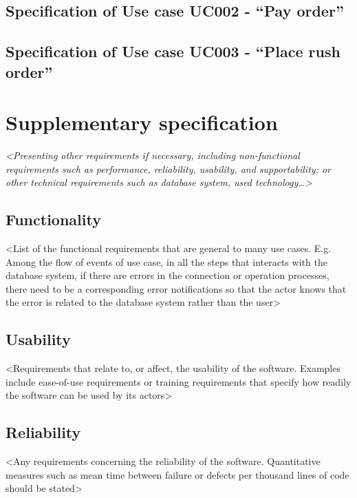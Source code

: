 \documentclass[letterpaper]{report}
\begin{document}
\section[Specification of Use case UC002 {}- “Pay order”]{Specification of Use case UC002 - “Pay order”}


\section[Specification of Use case UC003 {}- “Place rush order”]{Specification of Use case UC003 - “Place rush order”}



\chapter{Supplementary specification}
\textit{{\textless}Presenting other requirements if necessary, including non-functional requirements such as performance, reliability, usability, and supportability; or other technical requirements such as database system, used technology…{\textgreater}}

\section{Functionality}
 {\textless}List of the functional requirements that are general to many use cases. E.g. Among the flow of events of use case, in all the steps that interacts with the database system, if there are errors in the connection or operation processes, there need to be a corresponding error notifications so that the actor knows that the error is related to the database system rather than the user{\textgreater}

\section{Usability}
 {\textless}Requirements that relate to, or affect, the usability of the software. Examples include ease-of-use requirements or training requirements that specify how readily the software can be used by its actors{\textgreater}

\section{Reliability}
 {\textless}Any requirements concerning the reliability of the software. Quantitative measures such as mean time between failure or defects per thousand lines of code should be stated{\textgreater}
\end{document}
